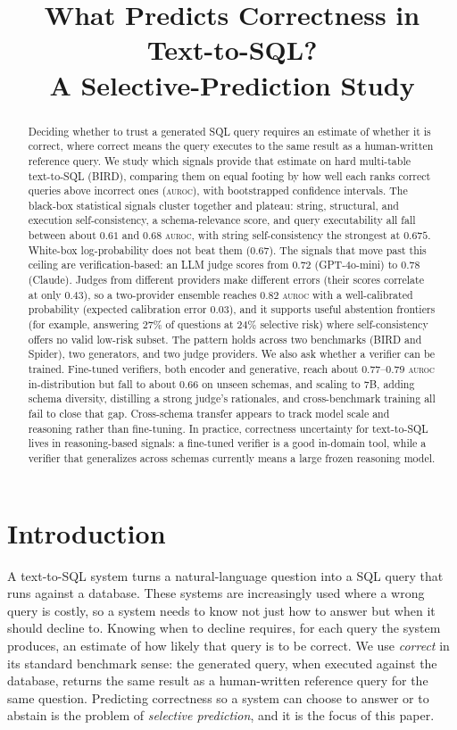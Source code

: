 \documentclass[11pt]{article}
\title{What Predicts Correctness in Text-to-SQL?\\ A Selective-Prediction Study}
\author{}
\date{}
\newcommand{\auroc}{\textsc{auroc}}
\begin{document}
\maketitle

\begin{abstract}
Deciding whether to trust a generated SQL query requires an estimate of whether it is correct, where
correct means the query executes to the same result as a human-written reference query. We study
which signals provide that estimate on hard multi-table text-to-SQL (BIRD), comparing them on equal
footing by how well each ranks correct queries above incorrect ones (\auroc{}), with bootstrapped
confidence intervals. The black-box statistical signals cluster
together and plateau: string, structural, and execution self-consistency, a schema-relevance score,
and query executability all fall between about $0.61$ and $0.68$ \auroc{}, with string
self-consistency the strongest at $0.675$. White-box log-probability does not beat them ($0.67$). The
signals that move past this ceiling are verification-based: an LLM judge scores from $0.72$
(GPT-4o-mini) to $0.78$ (Claude). Judges from different providers make different errors (their scores
correlate at only $0.43$), so a two-provider ensemble reaches $0.82$ \auroc{} with a well-calibrated
probability (expected calibration error $0.03$), and it supports useful abstention frontiers (for
example, answering $27\%$ of questions at $24\%$ selective risk) where self-consistency offers no
valid low-risk subset. The pattern holds across two benchmarks (BIRD and Spider), two generators, and
two judge providers. We also ask whether a verifier can be trained. Fine-tuned verifiers, both encoder and generative, reach about
$0.77$--$0.79$ \auroc{} in-distribution but fall to about $0.66$ on unseen schemas, and scaling to
7B, adding schema diversity, distilling a strong judge's rationales, and cross-benchmark training all
fail to close that gap. Cross-schema transfer appears to track model scale and reasoning rather than
fine-tuning. In practice, correctness uncertainty for text-to-SQL lives in reasoning-based signals: a
fine-tuned verifier is a good in-domain tool, while a verifier that generalizes across schemas
currently means a large frozen reasoning model.
\end{abstract}

\section{Introduction}
A text-to-SQL system turns a natural-language question into a SQL query that runs against a database.
These systems are increasingly used where a wrong query is costly, so a system needs to know not just
how to answer but when it should decline to. Knowing when to decline requires, for each query the
system produces, an estimate of how likely that query is to be correct. We use \emph{correct} in its
standard benchmark sense: the generated query, when executed against the database, returns the same
result as a human-written reference query for the same question. Predicting correctness so a system
can choose to answer or to abstain is the problem of \emph{selective prediction}, and it is the focus
of this paper.
\end{document}
